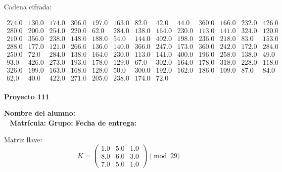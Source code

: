\documentclass[12pt]{article}
\begin{document}
Cadena cifrada:
\begin{center}
$\begin{array}{lllllllllllll}
274.0 & 130.0 & 174.0 & 306.0 & 197.0 & 163.0 & 82.0 & 42.0 & 44.0 & 360.0 & 166.0 & 232.0 & 426.0\\
280.0 & 200.0 & 254.0 & 220.0 & 62.0 & 284.0 & 138.0 & 164.0 & 230.0 & 113.0 & 141.0 & 324.0 & 120.0\\
210.0 & 356.0 & 238.0 & 148.0 & 188.0 & 54.0 & 144.0 & 402.0 & 198.0 & 236.0 & 218.0 & 83.0 & 153.0\\
288.0 & 177.0 & 121.0 & 266.0 & 136.0 & 140.0 & 366.0 & 247.0 & 173.0 & 360.0 & 242.0 & 172.0 & 284.0\\
250.0 & 72.0 & 284.0 & 138.0 & 164.0 & 230.0 & 113.0 & 141.0 & 400.0 & 196.0 & 258.0 & 138.0 & 49.0\\
93.0 & 426.0 & 273.0 & 193.0 & 178.0 & 129.0 & 67.0 & 302.0 & 164.0 & 178.0 & 318.0 & 228.0 & 118.0\\
326.0 & 199.0 & 163.0 & 168.0 & 128.0 & 50.0 & 300.0 & 192.0 & 162.0 & 186.0 & 109.0 & 87.0 & 84.0\\
62.0 & 40.0 & 422.0 & 271.0 & 205.0 & 238.0 & 174.0 & 72.0\\
\end{array}$
\end{center}

\newpage


\textbf{Proyecto 111}

\textbf{Nombre del alumno:} \underline{\hspace{13cm}}\\\
\vspace{1cm}
\textbf{Matrícula:} \underline{\hspace{4cm}} \hspace{1cm}
\textbf{Grupo:} \underline{\hspace{2cm}}
\textbf{Fecha de entrega:} \underline{\hspace{2cm}}

\medskip

Matriz llave:
\[
K = \begin{pmatrix}
1.0 & 5.0 & 1.0\\
8.0 & 6.0 & 3.0\\
7.0 & 5.0 & 1.0
\end{pmatrix} \pmod{29}
\]
\end{document}
